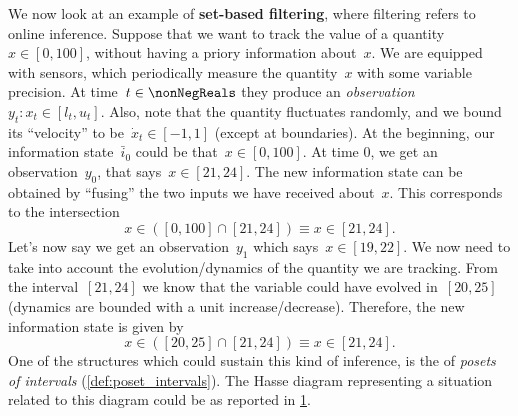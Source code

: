 \begin{example}
    We now look at an example of \textbf{set-based filtering}, where filtering refers to online inference.
    Suppose that we want to track the value of a quantity~$x\in [0,100]$, without having a priory information about~$x$.
    We are equipped with sensors, which periodically measure the quantity~$x$ with some variable precision.
    At time~$t\in \nonNegReals $ they produce an \emph{observation}~$y_t\colon x_t\in [l_t,u_t]$.
    Also, note that the quantity fluctuates randomly, and we bound its ``velocity'' to be~$\dot{x}_t\in [-1,1]$ (except at boundaries).
    At the beginning, our information state~$\bar{i}_0$ could be that~$x\in [0,100]$.
    At time 0, we get an observation~$y_0$, that says~$x\in [21,24]$.
    The new information state can be obtained by ``fusing'' the two inputs we have received about~$x$.
    This corresponds to the intersection
    \begin{equation*}
        x\in \left( [0,100] \cap [21,24]\right)\equiv x\in [21,24].
    \end{equation*}
    Let's now say we get an observation~$y_1$ which says~$x\in [19,22]$.
    We now need to take into account the evolution/dynamics of the quantity we are tracking.
    From the interval~$[21,24]$ we know that the variable could have evolved in~$[20,25]$ (dynamics are bounded with a unit increase/decrease).
    Therefore, the new information state is given by
    \begin{equation*}
        x\in \left( [20,25] \cap [21,24]\right)\equiv x\in [21,24].
    \end{equation*}
    One of the structures which could sustain this kind of inference, is the of \emph{posets of intervals} (\cref{def:poset_intervals}).
    The Hasse diagram representing a situation related to this diagram could be as reported in \cref{fig:hasse_filtering}.
    \begin{figure}[h!]
        \centering
        \caption{}
        \label{fig:hasse_filtering}
    \end{figure}
\end{example}

